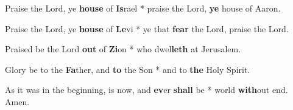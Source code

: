 \begin{multicols}{2}
	Praise the Lord, ye \textbf{house} of \textbf{Is}rael * praise the Lord, \textbf{ye} house of Aaron.
	
	Praise the Lord, ye \textbf{house} of \textbf{Le}vi * ye that \textbf{fear} the Lord, praise the Lord.
	
	Praised be the Lord \textbf{out} of \textbf{Zi}on * who dwel\textbf{leth} at Jerusalem.
	
	Glory be to the \textbf{Fa}ther, and \textbf{to} the Son * and to \textbf{the} Holy Spirit.
	
	As it was in the beginning, is now, and \textbf{ev}er \textbf{shall} be * world \textbf{with}out end. Amen.
\end{multicols}